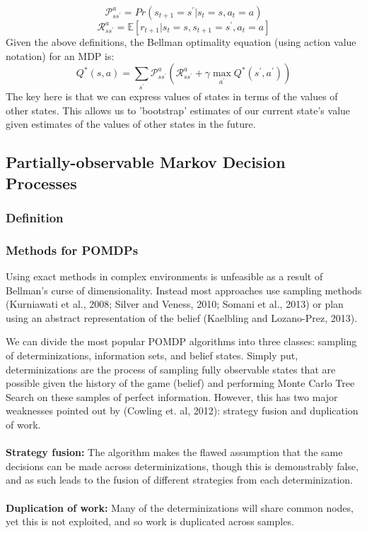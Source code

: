 \documentclass[a4paper,12pt]{proposal}
\begin{document}
\begin{equation}
\mathcal{P}_{s{s^\prime}}^a = Pr(s_{t+1} = {s^\prime} | s_t = s, a_t = a)
\end{equation}
\begin{equation}
\mathcal{R}_{s{s^\prime}}^a = \mathbb{E}[r_{t+1} | s_t = s, s_{t+1} = {s^\prime}, a_t = a]
\end{equation}
Given the above definitions, the Bellman optimality equation (using action value notation) for an MDP is:
\begin{equation}
Q^*(s,a) = \sum_{s^\prime} \mathcal{P}_{s{s^\prime}}^a (\mathcal{R}_{s{s^\prime}}^a + \gamma \max_{a^\prime} Q^*({s^\prime}, {a^\prime}))
\end{equation}
The key here is that we can express values of states in terms of the values of other states. This allows us to 'bootstrap' estimates of our current state's value given estimates of the values of other states in the future. 

\subsection{Partially-observable Markov Decision Processes}
\subsubsection{Definition}


\subsubsection{Methods for POMDPs}
Using exact methods in complex environments is unfeasible as a result of Bellman’s curse of dimensionality. Instead most approaches use sampling methods (Kurniawati et al., 2008; Silver and Veness, 2010; Somani et al., 2013) or plan using an abstract representation of the belief (Kaelbling and Lozano-Prez, 2013). 

We can divide the most popular POMDP algorithms into three classes: sampling of determinizations, information sets, and belief states. Simply put, determinizations are the process of sampling fully observable states that are possible given the history of the game (belief) and performing Monte Carlo Tree Search on these samples of perfect information. However, this has two major weaknesses pointed out by (Cowling et. al, 2012): strategy fusion and duplication of work. 
\\
\\
\textbf{Strategy fusion:} The algorithm makes the flawed assumption that the same decisions can be made across determinizations, though this is demonstrably false, and as such leads to the fusion of different strategies from each determinization.
\\
\\
\textbf{Duplication of work:} Many of the determinizations will share common nodes, yet this is not exploited, and so work is duplicated across samples.
\\
\end{document}
